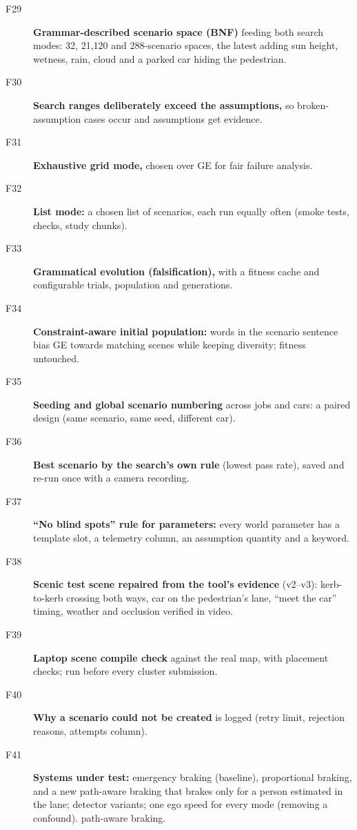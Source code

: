 \begin{description}
\item[F29] \textbf{Grammar-described scenario space (BNF)} feeding both search modes: 32, 21{,}120 and 288-scenario spaces, the latest adding sun height, wetness, rain, cloud and a parked car hiding the pedestrian. 
\item[F30] \textbf{Search ranges deliberately exceed the assumptions,} so broken-assumption cases occur and assumptions get evidence. \tagnew{}
\item[F31] \textbf{Exhaustive grid mode,} chosen over GE for fair failure analysis. \tagnew{} 
\item[F32] \textbf{List mode:} a chosen list of scenarios, each run equally often (smoke tests, checks, study chunks). \tagnew{}
\item[F33] \textbf{Grammatical evolution (falsification),} with a fitness cache and configurable trials, population and generations.  
\item[F34] \textbf{Constraint-aware initial population:} words in the scenario sentence bias GE towards matching scenes while keeping diversity; fitness untouched. \tagnew{} 
\item[F35] \textbf{Seeding and global scenario numbering} across jobs and cars: a paired design (same scenario, same seed, different car). \tagnew{}
\item[F36] \textbf{Best scenario by the search's own rule} (lowest pass rate), saved and re-run once with a camera recording. 
\item[F37] \textbf{``No blind spots'' rule for parameters:} every world parameter has a template slot, a telemetry column, an assumption quantity and a keyword. \tagnew{} 
\item[F38] \textbf{Scenic test scene repaired from the tool's evidence} (v2--v3): kerb-to-kerb crossing both ways, car on the pedestrian's lane, ``meet the car'' timing, weather and occlusion verified in video. \tagnew{} 
\item[F39] \textbf{Laptop scene compile check} against the real map, with placement checks; run before every cluster submission. \tagnew{} 
\item[F40] \textbf{Why a scenario could not be created} is logged (retry limit, rejection reasons, attempts column). \taginfra
\item[F41] \textbf{Systems under test:} emergency braking (baseline), proportional braking, and a new path-aware braking that brakes only for a person estimated in the lane; detector variants; one ego speed for every mode (removing a confound).  \tagnew{} path-aware braking.
\end{description}

